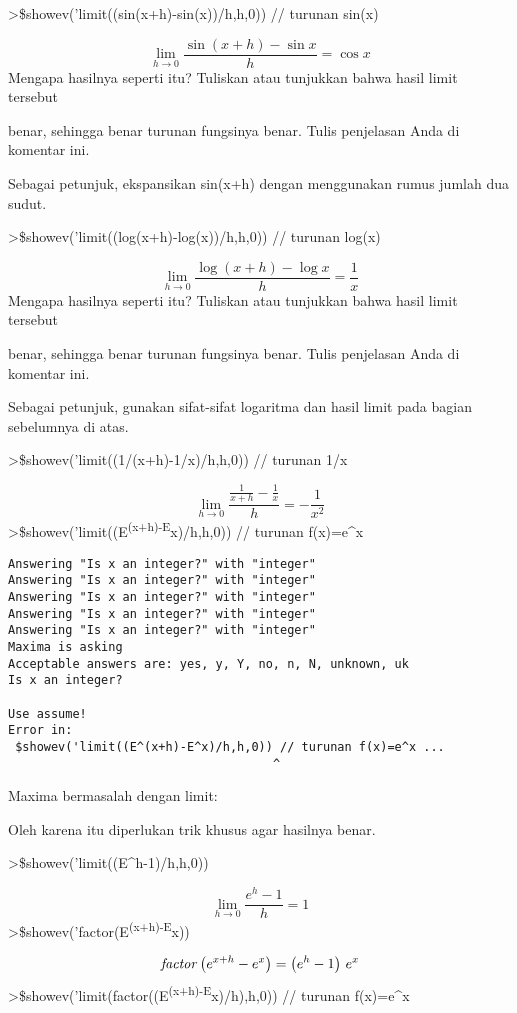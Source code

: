 \documentclass[
]{book}
\begin{document}
\textgreater\$showev('limit((sin(x+h)-sin(x))/h,h,0)) // turunan sin(x)

\[\lim_{h\rightarrow 0}{\frac{\sin \left(x+h\right)-\sin x}{h}}=\cos   x\]Mengapa hasilnya seperti itu? Tuliskan atau tunjukkan bahwa hasil limit tersebut

benar, sehingga benar turunan fungsinya benar. Tulis penjelasan Anda di komentar ini.

Sebagai petunjuk, ekspansikan sin(x+h) dengan menggunakan rumus jumlah dua sudut.

\textgreater\$showev('limit((log(x+h)-log(x))/h,h,0)) // turunan log(x)

\[\lim_{h\rightarrow 0}{\frac{\log \left(x+h\right)-\log x}{h}}=  \frac{1}{x}\]Mengapa hasilnya seperti itu? Tuliskan atau tunjukkan bahwa hasil limit tersebut

benar, sehingga benar turunan fungsinya benar. Tulis penjelasan Anda di komentar ini.

Sebagai petunjuk, gunakan sifat-sifat logaritma dan hasil limit pada bagian sebelumnya di atas.

\textgreater\$showev('limit((1/(x+h)-1/x)/h,h,0)) // turunan 1/x

\[\lim_{h\rightarrow 0}{\frac{\frac{1}{x+h}-\frac{1}{x}}{h}}=-\frac{1  }{x^2}\]\textgreater\$showev('limit((E\textsuperscript{(x+h)-E}x)/h,h,0)) // turunan f(x)=e\^{}x

\begin{verbatim}
Answering "Is x an integer?" with "integer"
Answering "Is x an integer?" with "integer"
Answering "Is x an integer?" with "integer"
Answering "Is x an integer?" with "integer"
Answering "Is x an integer?" with "integer"
Maxima is asking
Acceptable answers are: yes, y, Y, no, n, N, unknown, uk
Is x an integer?

Use assume!
Error in:
 $showev('limit((E^(x+h)-E^x)/h,h,0)) // turunan f(x)=e^x ...
                                     ^
\end{verbatim}

Maxima bermasalah dengan limit:

Oleh karena itu diperlukan trik khusus agar hasilnya benar.

\textgreater\$showev('limit((E\^{}h-1)/h,h,0))

\[\lim_{h\rightarrow 0}{\frac{e^{h}-1}{h}}=1\]\textgreater\$showev('factor(E\textsuperscript{(x+h)-E}x))

\[{\it factor}\left(e^{x+h}-e^{x}\right)=\left(e^{h}-1\right)\,e^{x}\]\textgreater\$showev('limit(factor((E\textsuperscript{(x+h)-E}x)/h),h,0)) // turunan f(x)=e\^{}x
\end{document}
